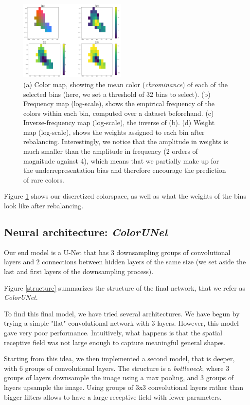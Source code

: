 \documentclass[10pt,twocolumn,letterpaper]{article}
\begin{document}
\begin{figure}
\begin{center}
\includegraphics[width=200px]{cdexample.png}
\caption{(a) Color map, showing the mean color (\textit{chrominance}) of each of the selected bins (here, we set a threshold of 32 bins to select). (b) Frequency map (log-scale), shows the empirical frequency of the colors within each bin, computed over a dataset beforehand. (c) Inverse-frequency map (log-scale), \ie the inverse of (b). (d) Weight map (log-scale), shows the weights assigned to each bin after rebalancing. Interestingly, we notice that the amplitude in weights is much smaller than the amplitude in frequency (2 orders of magnitude against 4), which means that we partially make up for the underrepresentation bias and therefore encourage the prediction of rare colors.}
\label{cdex}
\end{center}
\end{figure}

Figure \ref{cdex} shows our discretized colorspace, as well as what the weights of the bins look like after rebalancing.

\subsection{Neural architecture: \textit{ColorUNet}}

Our end model is a U-Net that has 3 downsampling groups of convolutional layers and 2 connections between hidden layers of the same size (we set aside the last and first layers of the downsampling process).

Figure \ref{structure} summarizes the structure of the final network, that we refer as \textit{ColorUNet}.

To find this final model, we have tried several architectures. We have begun by trying a simple "flat" convolutional network with 3 layers. However, this model gave very poor performance. Intuitively, what happens is that the spatial receptive field was not large enough to capture meaningful general shapes.

Starting from this idea, we then implemented a second model, that is deeper, with 6 groups of convolutional layers. The structure is a \textit{bottleneck}, where 3 groups of layers downsample the image using a max pooling, and 3 groups of layers upsample the image. Using groups of 3x3 convolutional layers rather than bigger filters allows to have a large receptive field with fewer parameters.
\end{document}
